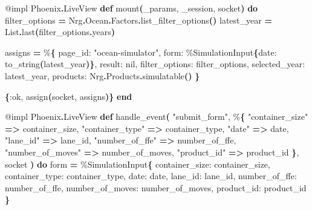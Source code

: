 \documentclass[11pt,a4paper,greek,twoside]{template-xe}
\newenvironment{Shaded}{\begin{english}\begin{snugshade}}{\end{snugshade}\end{english}}
\newcommand{\ConstantTok}[1]{\textcolor[rgb]{0.56,0.35,0.01}{#1}}
\newcommand{\FunctionTok}[1]{\textcolor[rgb]{0.13,0.29,0.53}{\textbf{#1}}}
\newcommand{\KeywordTok}[1]{\textcolor[rgb]{0.13,0.29,0.53}{\textbf{#1}}}
\newcommand{\NormalTok}[1]{#1}
\newcommand{\OperatorTok}[1]{\textcolor[rgb]{0.81,0.36,0.00}{\textbf{#1}}}
\newcommand{\OtherTok}[1]{\textcolor[rgb]{0.56,0.35,0.01}{#1}}
\newcommand{\StringTok}[1]{\textcolor[rgb]{0.31,0.60,0.02}{#1}}
\newcommand{\VariableTok}[1]{\textcolor[rgb]{0.00,0.00,0.00}{#1}}
\begin{document}
\begin{Shaded}
\begin{Highlighting}[]
\OtherTok{@impl} \ConstantTok{Phoenix}\OperatorTok{.}\ConstantTok{LiveView}
\KeywordTok{def}\NormalTok{ mount}\FunctionTok{(}\NormalTok{\_params, \_session, socket}\FunctionTok{)} \KeywordTok{do}
\NormalTok{  filter\_options }\OperatorTok{=} \ConstantTok{Nrg}\OperatorTok{.}\ConstantTok{Ocean}\OperatorTok{.}\ConstantTok{Factors}\OperatorTok{.}\NormalTok{list\_filter\_options}\FunctionTok{()}
\NormalTok{  latest\_year }\OperatorTok{=} \ConstantTok{List}\OperatorTok{.}\NormalTok{last}\FunctionTok{(}\NormalTok{filter\_options}\OperatorTok{.}\NormalTok{years}\FunctionTok{)}

\NormalTok{  assigns }\OperatorTok{=}\NormalTok{ \%}\FunctionTok{\{}
    \VariableTok{page\_id:} \StringTok{"ocean{-}simulator"}\NormalTok{,}
    \VariableTok{form:}\NormalTok{ \%}\ConstantTok{SimulationInput}\FunctionTok{\{}\VariableTok{date:}\NormalTok{ to\_string}\FunctionTok{(}\NormalTok{latest\_year}\FunctionTok{)\}}\NormalTok{,}
    \VariableTok{result:} \ConstantTok{nil}\NormalTok{,}
    \VariableTok{filter\_options:}\NormalTok{ filter\_options,}
    \VariableTok{selected\_year:}\NormalTok{ latest\_year,}
    \VariableTok{products:} \ConstantTok{Nrg}\OperatorTok{.}\ConstantTok{Products}\OperatorTok{.}\NormalTok{simulatable}\FunctionTok{()}
  \FunctionTok{\}}

  \FunctionTok{\{}\VariableTok{:ok}\NormalTok{, assign}\FunctionTok{(}\NormalTok{socket, assigns}\FunctionTok{)\}}
\KeywordTok{end}

\OtherTok{@impl} \ConstantTok{Phoenix}\OperatorTok{.}\ConstantTok{LiveView}
\KeywordTok{def}\NormalTok{ handle\_event}\FunctionTok{(}
      \StringTok{"submit\_form"}\NormalTok{,}
\NormalTok{      \%}\FunctionTok{\{}
        \StringTok{"container\_size"} \OperatorTok{=\textgreater{}}\NormalTok{ container\_size,}
        \StringTok{"container\_type"} \OperatorTok{=\textgreater{}}\NormalTok{ container\_type,}
        \StringTok{"date"} \OperatorTok{=\textgreater{}}\NormalTok{ date,}
        \StringTok{"lane\_id"} \OperatorTok{=\textgreater{}}\NormalTok{ lane\_id,}
        \StringTok{"number\_of\_ffe"} \OperatorTok{=\textgreater{}}\NormalTok{ number\_of\_ffe,}
        \StringTok{"number\_of\_moves"} \OperatorTok{=\textgreater{}}\NormalTok{ number\_of\_moves,}
        \StringTok{"product\_id"} \OperatorTok{=\textgreater{}}\NormalTok{ product\_id}
      \FunctionTok{\}}\NormalTok{,}
\NormalTok{      socket}
    \FunctionTok{)} \KeywordTok{do}
\NormalTok{  form }\OperatorTok{=}
\NormalTok{    \%}\ConstantTok{SimulationInput}\FunctionTok{\{}
      \VariableTok{container\_size:}\NormalTok{ container\_size,}
      \VariableTok{container\_type:}\NormalTok{ container\_type,}
      \VariableTok{date:}\NormalTok{ date,}
      \VariableTok{lane\_id:}\NormalTok{ lane\_id,}
      \VariableTok{number\_of\_ffe:}\NormalTok{ number\_of\_ffe,}
      \VariableTok{number\_of\_moves:}\NormalTok{ number\_of\_moves,}
      \VariableTok{product\_id:}\NormalTok{ product\_id}
    \FunctionTok{\}}


\end{Highlighting}
\end{Shaded}
\end{document}
